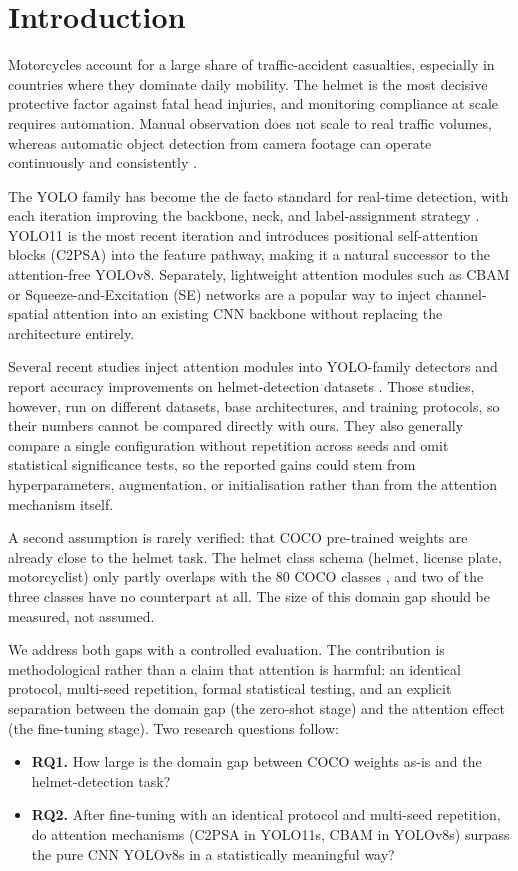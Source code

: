 \documentclass[conference]{IEEEtran}
\begin{document}
\section{Introduction}

Motorcycles account for a large share of traffic-accident casualties, especially in countries where they dominate daily mobility. The helmet is the most decisive protective factor against fatal head injuries, and monitoring compliance at scale requires automation. Manual observation does not scale to real traffic volumes, whereas automatic object detection from camera footage can operate continuously and consistently \cite{ref1}.

The YOLO family has become the de facto standard for real-time detection, with each iteration improving the backbone, neck, and label-assignment strategy \cite{ref5, ref_terven, ref_yolov9, ref_yolov10}. YOLO11 is the most recent iteration and introduces positional self-attention blocks (C2PSA) into the feature pathway, making it a natural successor to the attention-free YOLOv8. Separately, lightweight attention modules such as CBAM \cite{ref9} or Squeeze-and-Excitation (SE) networks \cite{ref_senet} are a popular way to inject channel-spatial attention into an existing CNN backbone without replacing the architecture entirely.

Several recent studies inject attention modules into YOLO-family detectors and report accuracy improvements on helmet-detection datasets \cite{ref4, ref19, ref20}. Those studies, however, run on different datasets, base architectures, and training protocols, so their numbers cannot be compared directly with ours. They also generally compare a single configuration without repetition across seeds and omit statistical significance tests, so the reported gains could stem from hyperparameters, augmentation, or initialisation rather than from the attention mechanism itself.

A second assumption is rarely verified: that COCO pre-trained weights are already close to the helmet task. The helmet class schema (helmet, license plate, motorcyclist) only partly overlaps with the 80 COCO classes \cite{ref14}, and two of the three classes have no counterpart at all. The size of this domain gap should be measured, not assumed.

We address both gaps with a controlled evaluation. The contribution is methodological rather than a claim that attention is harmful: an identical protocol, multi-seed repetition, formal statistical testing, and an explicit separation between the domain gap (the zero-shot stage) and the attention effect (the fine-tuning stage). Two research questions follow:
\begin{itemize}
\item \textbf{RQ1.} How large is the domain gap between COCO weights as-is and the helmet-detection task?
\item \textbf{RQ2.} After fine-tuning with an identical protocol and multi-seed repetition, do attention mechanisms (C2PSA in YOLO11s, CBAM in YOLOv8s) surpass the pure CNN YOLOv8s in a statistically meaningful way?
\end{itemize}
\end{document}
